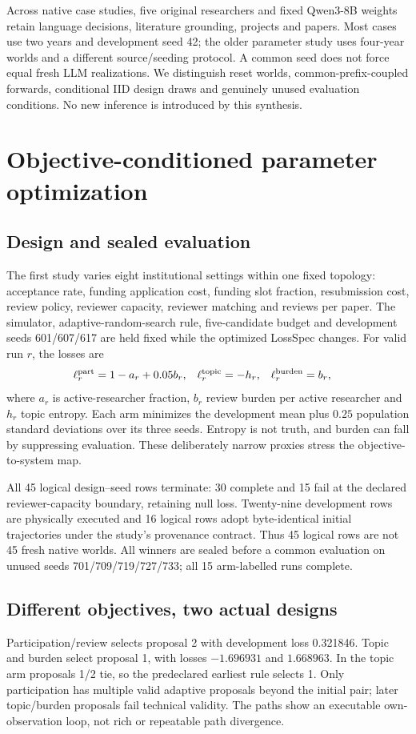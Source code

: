 Across native case studies, five original researchers and fixed Qwen3-8B
weights retain language decisions, literature grounding, projects and papers.
Most cases use two years and development seed 42; the older parameter study
uses four-year worlds and a different source/seeding protocol. A common seed
does not force equal fresh LLM realizations. We distinguish reset worlds,
common-prefix-coupled forwards, conditional IID design draws and genuinely
unused evaluation conditions. No new inference is introduced by this synthesis.

\section{Objective-conditioned parameter optimization}
\label{sec:parameter}
\subsection{Design and sealed evaluation}
The first study varies eight institutional settings within one fixed topology:
acceptance rate, funding application cost, funding slot fraction, resubmission
cost, review policy, reviewer capacity, reviewer matching and reviews per paper.
The simulator, adaptive-random-search rule, five-candidate budget and development
seeds 601/607/617 are held fixed while the optimized LossSpec changes.
For valid run $ r $, the losses are
\begin{align}
 \ell_r^{\rm part}&=1-a_r+0.05b_r,&
 \ell_r^{\rm topic}&=-h_r,&
 \ell_r^{\rm burden}&=b_r,
\end{align}
where $ a_r $ is active-researcher fraction, $ b_r $ review burden per active
researcher and $ h_r $ topic entropy. Each arm minimizes the development mean
plus $0.25$ population standard deviations over its three seeds. Entropy is
not truth, and burden can fall by suppressing evaluation. These deliberately
narrow proxies stress the objective-to-system map.

All 45 logical design--seed rows terminate: 30 complete and 15 fail at the declared
reviewer-capacity boundary, retaining null loss. Twenty-nine development rows
are physically executed and 16 logical rows adopt byte-identical initial
trajectories under the study's provenance contract. Thus 45 logical rows are
not 45 fresh native worlds. All winners are sealed before a common evaluation
on unused seeds 701/709/719/727/733; all 15 arm-labelled runs complete.

\subsection{Different objectives, two actual designs}
Participation/review selects proposal 2 with development loss 0.321846. Topic
and burden select proposal 1, with losses $-1.696931$ and $1.668963$. In the
topic arm proposals 1/2 tie, so the predeclared earliest rule selects 1. Only
participation has multiple valid adaptive proposals beyond the initial pair;
later topic/burden proposals fail technical validity. The paths show an
executable own-observation loop, not rich or repeatable path divergence.

